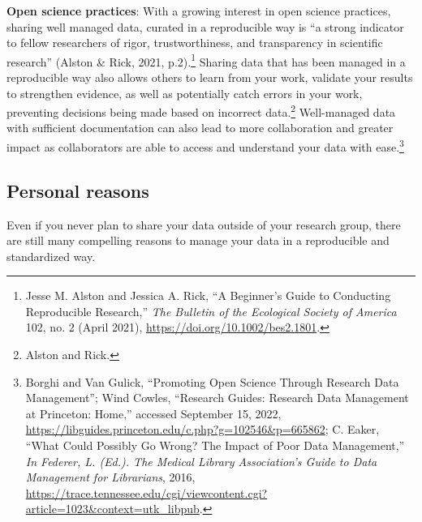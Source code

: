 \documentclass[
]{book}
\begin{document}
\begin{enumerate}
  \textbf{Open science practices}: With a growing interest in open science practices, sharing well managed data, curated in a reproducible way is ``a strong indicator to fellow researchers of rigor, trustworthiness, and transparency in scientific research'' (Alston \& Rick, 2021, p.2).\footnote{Jesse M. Alston and Jessica A. Rick, {``A Beginner's Guide to Conducting Reproducible Research,''} \emph{The Bulletin of the Ecological Society of America} 102, no. 2 (April 2021), \url{https://doi.org/10.1002/bes2.1801}.} Sharing data that has been managed in a reproducible way also allows others to learn from your work, validate your results to strengthen evidence, as well as potentially catch errors in your work, preventing decisions being made based on incorrect data.\footnote{Alston and Rick.} Well-managed data with sufficient documentation can also lead to more collaboration and greater impact as collaborators are able to access and understand your data with ease.\footnote{Borghi and Van Gulick, {``Promoting Open Science Through Research Data Management''}; Wind Cowles, {``Research Guides: Research Data Management at Princeton: Home,''} accessed September 15, 2022, \url{https://libguides.princeton.edu/c.php?g=102546\&p=665862}; C. Eaker, {``What Could Possibly Go Wrong? The Impact of Poor Data Management,''} \emph{In Federer, L. (Ed.). The Medical Library Association's Guide to Data Management for Librarians}, 2016, \url{https://trace.tennessee.edu/cgi/viewcontent.cgi?article=1023\&context=utk_libpub}.}
\end{enumerate}

\hypertarget{personal-reasons}{%
\subsection{Personal reasons}\label{personal-reasons}}

Even if you never plan to share your data outside of your research group, there are still many compelling reasons to manage your data in a reproducible and standardized way.
\end{document}

